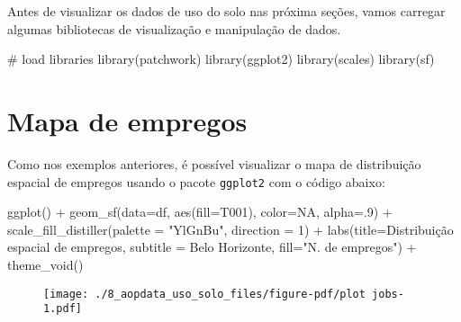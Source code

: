 \documentclass[
  letterpaper,
  DIV=11,
  numbers=noendperiod]{scrreprt}
\newenvironment{Shaded}{\begin{snugshade}}{\end{snugshade}}
\newcommand{\AttributeTok}[1]{\textcolor[rgb]{0.40,0.45,0.13}{#1}}
\newcommand{\CommentTok}[1]{\textcolor[rgb]{0.37,0.37,0.37}{#1}}
\newcommand{\ConstantTok}[1]{\textcolor[rgb]{0.56,0.35,0.01}{#1}}
\newcommand{\DecValTok}[1]{\textcolor[rgb]{0.68,0.00,0.00}{#1}}
\newcommand{\FunctionTok}[1]{\textcolor[rgb]{0.28,0.35,0.67}{#1}}
\newcommand{\NormalTok}[1]{\textcolor[rgb]{0.00,0.23,0.31}{#1}}
\newcommand{\SpecialCharTok}[1]{\textcolor[rgb]{0.37,0.37,0.37}{#1}}
\newcommand{\StringTok}[1]{\textcolor[rgb]{0.13,0.47,0.30}{#1}}
\begin{document}
Antes de visualizar os dados de uso do solo nas próxima seções, vamos
carregar algumas bibliotecas de visualização e manipulação de dados.

\begin{Shaded}
\begin{Highlighting}[]
\CommentTok{\# load libraries}
\FunctionTok{library}\NormalTok{(patchwork)}
\FunctionTok{library}\NormalTok{(ggplot2)}
\FunctionTok{library}\NormalTok{(scales)}
\FunctionTok{library}\NormalTok{(sf)}
\end{Highlighting}
\end{Shaded}

\hypertarget{mapa-de-empregos}{%
\section{Mapa de empregos}\label{mapa-de-empregos}}

Como nos exemplos anteriores, é possível visualizar o mapa de
distribuição espacial de empregos usando o pacote \texttt{ggplot2} com o
código abaixo:

\begin{Shaded}
\begin{Highlighting}[]
\FunctionTok{ggplot}\NormalTok{() }\SpecialCharTok{+}
  \FunctionTok{geom\_sf}\NormalTok{(}\AttributeTok{data=}\NormalTok{df, }\FunctionTok{aes}\NormalTok{(}\AttributeTok{fill=}\NormalTok{T001), }\AttributeTok{color=}\ConstantTok{NA}\NormalTok{, }\AttributeTok{alpha=}\NormalTok{.}\DecValTok{9}\NormalTok{) }\SpecialCharTok{+}
  \FunctionTok{scale\_fill\_distiller}\NormalTok{(}\AttributeTok{palette =} \StringTok{"YlGnBu"}\NormalTok{, }\AttributeTok{direction =} \DecValTok{1}\NormalTok{) }\SpecialCharTok{+}
  \FunctionTok{labs}\NormalTok{(}\AttributeTok{title=}\StringTok{\textquotesingle{}Distribuição espacial de empregos\textquotesingle{}}\NormalTok{, }
       \AttributeTok{subtitle =} \StringTok{\textquotesingle{}Belo Horizonte\textquotesingle{}}\NormalTok{, }\AttributeTok{fill=}\StringTok{"N. de empregos"}\NormalTok{) }\SpecialCharTok{+}
  \FunctionTok{theme\_void}\NormalTok{()}
\end{Highlighting}
\end{Shaded}

\begin{figure}[H]

{\centering \texttt{[image: ./8\_aopdata\_uso\_solo\_files/figure-pdf/plot jobs-1.pdf]}

}

\end{figure}
\end{document}

